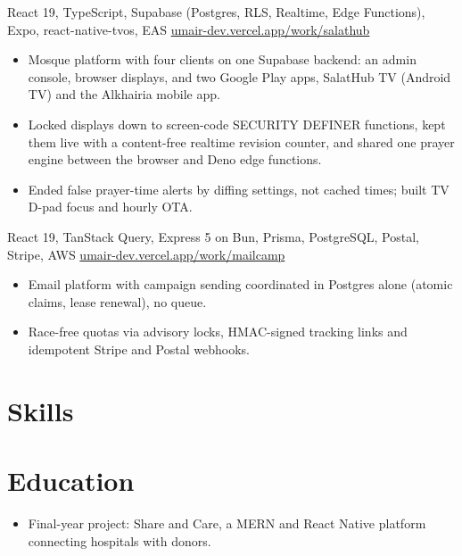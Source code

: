   {React 19, TypeScript, Supabase (Postgres, RLS, Realtime, Edge Functions), Expo, react-native-tvos, EAS}
  {\href{https://umair-dev.vercel.app/work/salathub}{umair-dev.vercel.app/work/salathub}}
\begin{itemize}
  \item Mosque platform with four clients on one Supabase backend: an admin console, browser displays, and two Google Play apps, SalatHub TV (Android TV) and the Alkhairia mobile app.
  \item Locked displays down to screen-code SECURITY DEFINER functions, kept them live with a content-free realtime revision counter, and shared one prayer engine between the browser and Deno edge functions.
  \item Ended false prayer-time alerts by diffing settings, not cached times; built TV D-pad focus and hourly OTA.
\end{itemize}

  {React 19, TanStack Query, Express 5 on Bun, Prisma, PostgreSQL, Postal, Stripe, AWS}
  {\href{https://umair-dev.vercel.app/work/mailcamp}{umair-dev.vercel.app/work/mailcamp}}
\begin{itemize}
  \item Email platform with campaign sending coordinated in Postgres alone (atomic claims, lease renewal), no queue.
  \item Race-free quotas via advisory locks, HMAC-signed tracking links and idempotent Stripe and Postal webhooks.
\end{itemize}

\section{Skills}

\section{Education}
\begin{itemize}
  \item Final-year project: Share and Care, a MERN and React Native platform connecting hospitals with donors.
\end{itemize}
